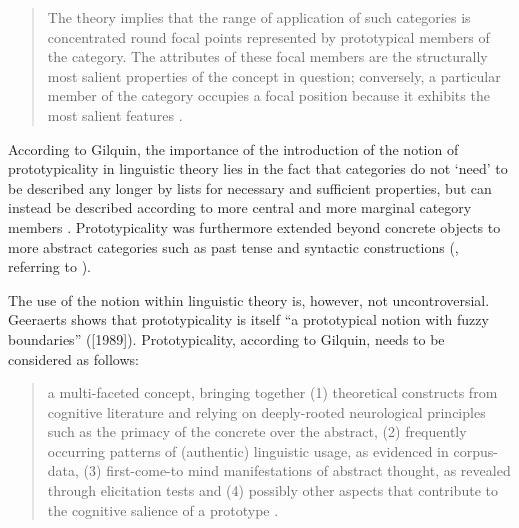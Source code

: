 \begin{quote}
The theory implies that the range of application of such categories is concentrated round focal points represented by prototypical members of the category. The attributes of these focal members are the structurally most salient properties of the concept in question; conversely, a particular member of the category occupies a focal position because it exhibits the most salient features \citep[578]{allan_lexical_2013}.
\end{quote}

According to Gilquin, the importance of the introduction of the notion of prototypicality in linguistic theory lies in the fact that categories do not ‘need’ to be described any longer by lists for necessary and sufficient properties, but can instead be described according to more central and more marginal category members \citep[160-161]{gilquin_place_2006}. Prototypicality was furthermore extended beyond concrete objects to more abstract categories such as past tense and syntactic constructions (\citealt{gilquin_place_2006}, referring to \citealt{taylor_linguistic_1989}).

The use of the notion within linguistic theory is, however, not uncontroversial. Geeraerts shows that prototypicality is itself “a prototypical notion with fuzzy boundaries” (\citealt{Geeraerts2006}[1989]). Prototypicality, according to Gilquin, needs to be considered as follows:

\begin{quote}
a multi-faceted concept, bringing together (1) theoretical constructs from cognitive literature and relying on deeply-rooted neurological principles such as the primacy of the concrete over the abstract, (2) frequently occurring patterns of (authentic) linguistic usage, as evidenced in corpus-data, (3) first-come-to mind manifestations of abstract thought, as revealed through elicitation tests and (4) possibly other aspects that contribute to the cognitive salience of a prototype \citep[180]{gilquin_place_2006}.
\end{quote}

